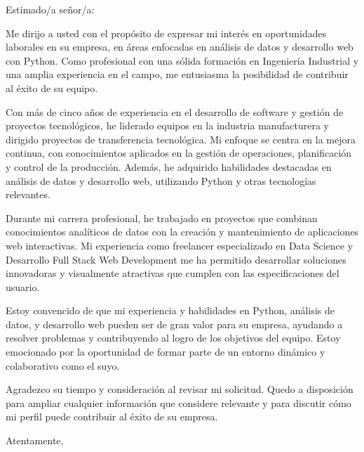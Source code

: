\documentclass{letter}
\begin{document}
	
	\begin{letter}{}
		
		\opening{Estimado/a señor/a:}
		
		Me dirijo a usted con el propósito de expresar mi interés en oportunidades laborales en su empresa, en áreas enfocadas en análisis de datos y desarrollo web con Python. Como profesional con una sólida formación en Ingeniería Industrial y una amplia experiencia en el campo, me entusiasma la posibilidad de contribuir al éxito de su equipo.
		
		Con más de cinco años de experiencia en el desarrollo de software y gestión de proyectos tecnológicos, he liderado equipos en la industria manufacturera y dirigido proyectos de transferencia tecnológica. Mi enfoque se centra en la mejora continua, con conocimientos aplicados en la gestión de operaciones, planificación y control de la producción. Además, he adquirido habilidades destacadas en análisis de datos y desarrollo web, utilizando Python y otras tecnologías relevantes.
		
		Durante mi carrera profesional, he trabajado en proyectos que combinan conocimientos analíticos de datos con la creación y mantenimiento de aplicaciones web interactivas. Mi experiencia como freelancer especializado en Data Science y Desarrollo Full Stack Web Development me ha permitido desarrollar soluciones innovadoras y visualmente atractivas que cumplen con las especificaciones del usuario.
		
		Estoy convencido de que mi experiencia y habilidades en Python, análisis de datos, y desarrollo web pueden ser de gran valor para su empresa, ayudando a resolver problemas y contribuyendo al logro de los objetivos del equipo. Estoy emocionado por la oportunidad de formar parte de un entorno dinámico y colaborativo como el suyo.
		
		Agradezco su tiempo y consideración al revisar mi solicitud. Quedo a disposición para ampliar cualquier información que considere relevante y para discutir cómo mi perfil puede contribuir al éxito de su empresa.
		
		\closing{Atentamente,}
		
	\end{letter}
\end{document}
